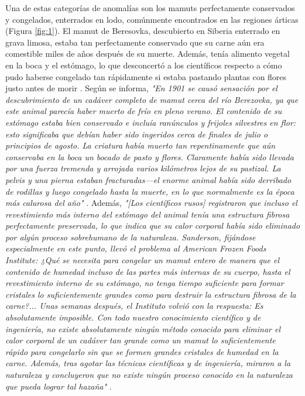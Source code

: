 \documentclass[10pt,twocolumn,letterpaper]{article}
\begin{document}
Una de estas categorías de anomalías son los mamuts perfectamente conservados y congelados, enterrados en lodo, comúnmente encontrados en las regiones árticas (Figura \ref{fig:1}). El mamut de Beresovka, descubierto en Siberia enterrado en grava limosa, estaba tan perfectamente conservado que su carne aún era comestible miles de años después de su muerte. Además, tenía alimento vegetal en la boca y el estómago, lo que desconcertó a los científicos respecto a cómo pudo haberse congelado tan rápidamente si estaba pastando plantas con flores justo antes de morir \cite{17}. Según se informa, \textit{"En 1901 se causó sensación por el descubrimiento de un cadáver completo de mamut cerca del río Berezovka, ya que este animal parecía haber muerto de frío en pleno verano. El contenido de su estómago estaba bien conservado e incluía ranúnculos y frijoles silvestres en flor: esto significaba que debían haber sido ingeridos cerca de finales de julio o principios de agosto. La criatura había muerto tan repentinamente que aún conservaba en la boca un bocado de pasto y flores. Claramente había sido llevada por una fuerza tremenda y arrojada varios kilómetros lejos de su pastizal. La pelvis y una pierna estaban fracturadas—el enorme animal había sido derribado de rodillas y luego congelado hasta la muerte, en lo que normalmente es la época más calurosa del año"} \cite{18}. Además, \textit{"[Los científicos rusos] registraron que incluso el revestimiento más interno del estómago del animal tenía una estructura fibrosa perfectamente preservada, lo que indica que su calor corporal había sido eliminado por algún proceso sobrehumano de la naturaleza. Sanderson, fijándose especialmente en este punto, llevó el problema al American Frozen Foods Institute: ¿Qué se necesita para congelar un mamut entero de manera que el contenido de humedad incluso de las partes más internas de su cuerpo, hasta el revestimiento interno de su estómago, no tenga tiempo suficiente para formar cristales lo suficientemente grandes como para destruir la estructura fibrosa de la carne?... Unas semanas después, el Instituto volvió con la respuesta: Es absolutamente imposible. Con todo nuestro conocimiento científico y de ingeniería, no existe absolutamente ningún método conocido para eliminar el calor corporal de un cadáver tan grande como un mamut lo suficientemente rápido para congelarlo sin que se formen grandes cristales de humedad en la carne. Además, tras agotar las técnicas científicas y de ingeniería, miraron a la naturaleza y concluyeron que no existe ningún proceso conocido en la naturaleza que pueda lograr tal hazaña"} \cite{19}.
\end{document}
